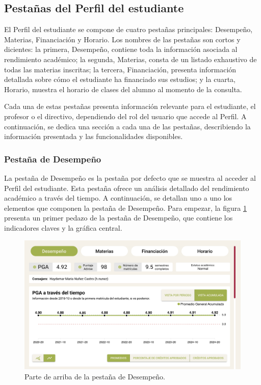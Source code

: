 \subsection{Pestañas del Perfil del estudiante}

El Perfil del estudiante se compone de cuatro pestañas principales: Desempeño, Materias, Financiación y Horario. Los nombres de las pestañas son cortos y dicientes: la primera, Desempeño, contiene toda la información asociada al rendimiento académico; la segunda, Materias, consta de un listado exhaustivo de todas las materias inscritas; la tercera, Financiación, presenta información detallada sobre cómo el estudiante ha financiado sus estudios; y la cuarta, Horario, muestra el horario de clases del alumno al momento de la consulta.

Cada una de estas pestañas presenta información relevante para el estudiante, el profesor o el directivo, dependiendo del rol del usuario que accede al Perfil. A continuación, se dedica una sección a cada una de las pestañas, describiendo la información presentada y las funcionalidades disponibles.

\subsubsection{Pestaña de Desempeño}

La pestaña de Desempeño es la pestaña por defecto que se muestra al acceder al Perfil del estudiante. Esta pestaña ofrece un análisis detallado del rendimiento académico a través del tiempo. A continuación, se detallan uno a uno los elementos que componen la pestaña de Desempeño. Para empezar, la figura \ref{fig:desempeno} presenta un primer pedazo de la pestaña de Desempeño, que contiene los indicadores claves y la gráfica central.

\begin{figure}[H]
	\includegraphics[width=\textwidth]{assets/nes/desempeno_1.png}
	\caption{Parte de arriba de la pestaña de Desempeño.}
	\label{fig:desempeno}
\end{figure}

